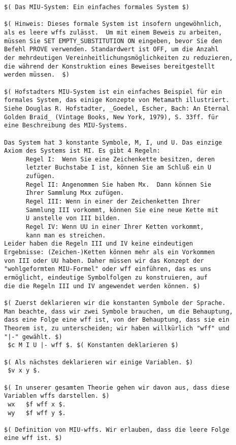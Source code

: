 \begin{verbatim}
$( Das MIU-System: Ein einfaches formales System $)

$( Hinweis: Dieses formale System ist insofern ungewöhnlich,
als es leere wffs zulässt.  Um mit einem Beweis zu arbeiten,
müssen Sie SET EMPTY_SUBSTITUTION ON eingeben, bevor Sie den
Befehl PROVE verwenden. Standardwert ist OFF, um die Anzahl
der mehrdeutigen Vereinheitlichungsmöglichkeiten zu reduzieren,
die während der Konstruktion eines Beweises bereitgestellt
werden müssen.  $) 

$( Hofstadters MIU-System ist ein einfaches Beispiel für ein
formales System, das einige Konzepte von Metamath illustriert.
Siehe Douglas R. Hofstadter, _Goedel, Escher, Bach: An Eternal
Golden Braid_ (Vintage Books, New York, 1979), S. 33ff. für
eine Beschreibung des MIU-Systems.

Das System hat 3 konstante Symbole, M, I, und U. Das einzige
Axiom des Systems ist MI. Es gibt 4 Regeln:
      Regel I:  Wenn Sie eine Zeichenkette besitzen, deren
      letzter Buchstabe I ist, können Sie am Schluß ein U
      zufügen.
      Regel II: Angenommen Sie haben Mx.  Dann können Sie
      Ihrer Sammlung Mxx zufügen.
      Regel III: Wenn in einer der Zeichenketten Ihrer
      Sammlung III vorkommt, können Sie eine neue Kette mit
      U anstelle von III bilden.
      Regel IV: Wenn UU in einer Ihrer Ketten vorkommt,
      kann man es streichen.
Leider haben die Regeln III und IV keine eindeutigen
Ergebnisse: (Zeichen-)Ketten können mehr als ein Vorkommen
von III oder UU haben. Daher müssen wir das Konzept der
"wohlgeformten MIU-Formel" oder wff einführen, das es uns
ermöglicht, eindeutige Symbolfolgen zu konstruieren, auf
die die Regeln III und IV angewendet werden können. $)

$( Zuerst deklarieren wir die konstanten Symbole der Sprache.
Man beachte, dass wir zwei Symbole brauchen, um die Behauptung,
dass eine Folge eine wff ist, von der Behauptung, dass sie ein
Theorem ist, zu unterscheiden; wir haben willkürlich "wff" und
"|-" gewählt. $)
 $c M I U |- wff $. $( Konstanten deklarieren $) 

$( Als nächstes deklarieren wir einige Variablen. $)
 $v x y $. 

$( In unserer gesamten Theorie gehen wir davon aus, dass diese
Variablen wffs darstellen. $) 
 wx   $f wff x $.
 wy   $f wff y $.

$( Definition von MIU-wffs. Wir erlauben, dass die leere Folge
eine wff ist. $) 


\end{verbatim}
